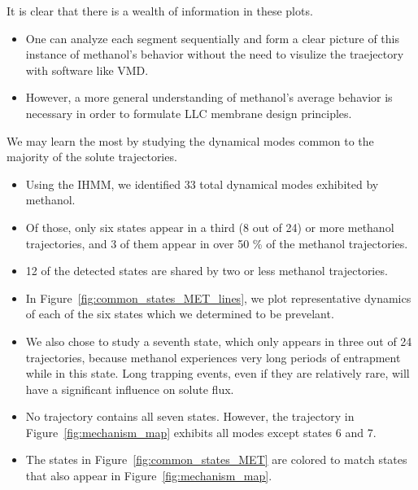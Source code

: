 \documentclass{article}
\begin{document}
  \noindent It is clear that there is a wealth of information in these plots. 
  \begin{itemize}
    \item One can analyze each segment sequentially and form a clear picture
    of this instance of methanol's behavior without the need to visulize
    the traejectory with software like VMD.
    \item However, a more general understanding of methanol's average behavior
    is necessary in order to formulate LLC membrane design principles.
  \end{itemize}
  
  \noindent We may learn the most by studying the dynamical modes common to the majority of 
  the solute trajectories.
  \begin{itemize}
    \item Using the IHMM, we identified 33 total dynamical modes exhibited by 
    methanol. 
    \item Of those, only six states appear in a third (8 out of 24) or more methanol 
    trajectories, and 3 of them appear in over 50 \% of the methanol trajectories.
    \item 12 of the detected states are shared by two or less methanol trajectories.  %
    \item In Figure~\ref{fig:common_states_MET_lines}, we plot representative dynamics
    of each of the six states which we determined to be prevelant.
    \item We also chose to study a seventh state, which only appears in three out of
    24 trajectories, because methanol experiences very long periods of entrapment
    while in this state. Long trapping events, even if they are relatively rare, will
    have a significant influence on solute flux.
    \item No trajectory contains all seven states. However, the trajectory in 
    Figure~\ref{fig:mechanism_map} exhibits all modes except states 6 and 7.
    \item The states in Figure~\ref{fig:common_states_MET} are colored to match
    states that also appear in Figure~\ref{fig:mechanism_map}.
  \end{itemize}
    
\end{document}

